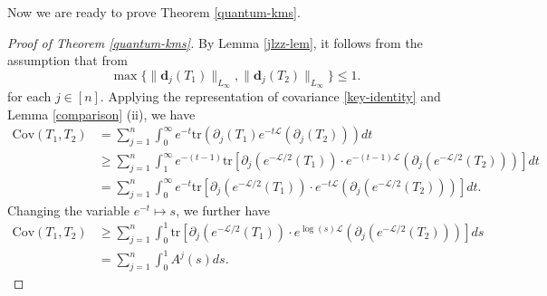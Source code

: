 \documentclass{amsbook}
\theoremstyle{definition}
\theoremstyle{remark}
\numberwithin{section}{chapter}
\numberwithin{equation}{chapter}
\newcommand{\1}{\mathbf{1}}
\newcommand{\La}{\mathcal{L}}
\newcommand{\dc}{\mathbf{d}}
\begin{document}
Now we are ready to prove Theorem \ref{quantum-kms}.  
\begin{proof}[Proof of Theorem \ref{quantum-kms}]
By Lemma \ref{jlzz-lem}, it follows from the assumption  that from  
\begin{equation}\label{dj T1 T2 1}
	\max\{\|\dc_{j}(T_1)\|_{L_{\infty}},\|\dc_{j}(T_2)\|_{L_{\infty}}\}\leq 1.
\end{equation}
for each $j\in [n]$. Applying the representation of covariance \eqref{key-identity} and Lemma \ref{comparison} (ii), we have
	\begin{equation*}\label{correlation-1}
		\begin{split}
			\mathrm{Cov}(T_1,T_2)&=\sum_{j=1}^{n}\int_{0}^{\infty}e^{-t}\mathrm{tr}\left(\partial_{j}(T_1)e^{-t\La}\left(\partial_{j}(T_2)\right)\right)dt\\
			&\geq \sum_{j=1}^{n}\int_{1}^{\infty}e^{-(t-1)}\mathrm{tr}\left[\partial_{j}\left(e^{-\La/2}(T_1)\right)\cdot e^{-(t-1)\La}\left(\partial_{j}\left(e^{-\La/2}(T_2)\right)\right)\right]dt\\
			&=\sum_{j=1}^{n}\int_{0}^{\infty}e^{-t}\mathrm{tr}\left[\partial_{j}\left(e^{-\La/2}(T_1)\right)\cdot e^{-t\La}\left(\partial_{j}\left(e^{-\La/2}(T_2)\right)\right)\right]dt.
		\end{split}
	\end{equation*}
	Changing the variable $e^{-t}\mapsto s$, we further have
	\begin{equation}\label{correlation-2}
	\begin{split}
\mathrm{Cov}(T_1,T_2)&\geq \sum_{j=1}^{n}\int_{0}^{1}\mathrm{tr}\left[\partial_{j}\left(e^{-\La/2}(T_1)\right)\cdot e^{\log(s)\La}\left(\partial_{j}\left(e^{-\La/2}(T_2)\right)\right)\right]ds\\
&=\sum_{j=1}^{n} \int_{0}^{1}A^{j}(s)ds.
\end{split}	
	\end{equation}
	

\end{proof}
\end{document}
